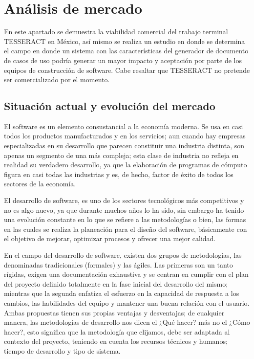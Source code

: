 \chapter{Análisis de mercado}

En este apartado se demuestra la viabilidad comercial del trabajo terminal TESSERACT en México, así mismo se realiza un estudio en donde se determina el campo en donde un sistema con las características del generador de documento de casos de uso podría generar un mayor impacto y aceptación por parte de los equipos de construcción de software. Cabe resaltar que TESSERACT no pretende ser comercializado por el momento.

\section{Situación actual  y evolución del mercado}

El software es un elemento consustancial a la economía moderna. Se usa en casi todos los productos manufacturados y en los servicios; aun cuando hay empresas especializadas en su desarrollo que parecen constituir una industria distinta, son apenas un segmento de una más compleja; esta clase de industria no refleja en realidad su verdadero desarrollo, ya que la elaboración de programas de cómputo figura en casi
todas las industrias y es, de hecho, factor de éxito de todos los sectores de la economía. 

El desarrollo de software, es uno de los sectores tecnológicos más competitivos y no es algo nuevo, ya que durante muchos años lo ha sido, sin embargo ha tenido una evolución constante en lo que se refiere a las metodologías o bien, las formas en las cuales se realiza la planeación para el diseño del software, básicamente con el objetivo de mejorar, optimizar procesos y ofrecer una mejor calidad.

En el campo del desarrollo de software, existen dos grupos de metodologías, las denominadas tradicionales (formales) y las ágiles.
Las primeras son un tanto rígidas, exigen una documentación exhaustiva y se centran en
cumplir con el plan del proyecto definido totalmente en la fase inicial del desarrollo del mismo; mientras que la segunda enfatiza el esfuerzo en la capacidad de respuesta a los cambios, las habilidades del equipo y mantener una buena relación con el usuario.
Ambas propuestas tienen sus propias ventajas y desventajas; de cualquier manera, las
metodologías de desarrollo nos dicen el ¿Qué hacer? más no el ¿Cómo hacer?, esto significa que la metodología que elijamos, debe ser adaptada al contexto del proyecto, teniendo en cuenta los recursos técnicos y humanos; tiempo de desarrollo y tipo de sistema.


